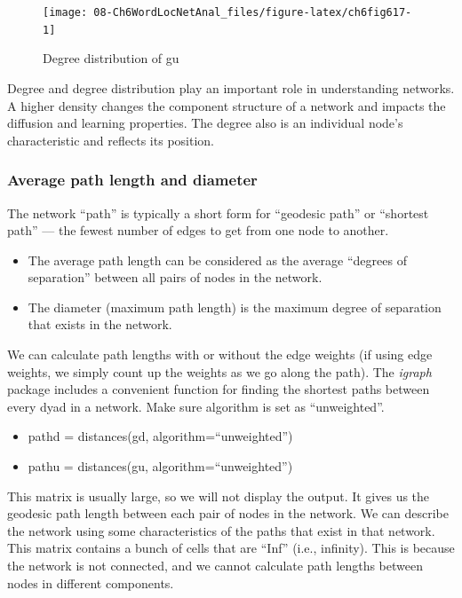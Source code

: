 \documentclass[
]{article}
\providecommand{\tightlist}{%
  \setlength{\itemsep}{0pt}\setlength{\parskip}{0pt}}
\begin{document}
\begin{figure}

{\centering \texttt{[image: 08-Ch6WordLocNetAnal\_files/figure-latex/ch6fig617-1]} 

}

\caption{Degree distribution of gu}\label{fig:ch6fig617}
\end{figure}

Degree and degree distribution play an important role in understanding networks. A higher density changes the component structure of a network and impacts the diffusion and learning properties. The degree also is an individual node's characteristic and reflects its position.

\hypertarget{average-path-length-and-diameter}{%
\subsubsection{Average path length and diameter}\label{average-path-length-and-diameter}}

The network ``path'' is typically a short form for ``geodesic path'' or ``shortest path'' --- the fewest number of edges to get from one node to another.

\begin{itemize}
\tightlist
\item
  The average path length can be considered as the average ``degrees of separation'' between all pairs of nodes in the network.
\item
  The diameter (maximum path length) is the maximum degree of separation that exists in the network.
\end{itemize}

We can calculate path lengths with or without the edge weights (if using edge weights, we simply count up the weights as we go along the path). The \emph{igraph} package includes a convenient function for finding the shortest paths between every dyad in a network. Make sure algorithm is set as ``unweighted''.

\begin{itemize}
\tightlist
\item
  pathd = distances(gd, algorithm=``unweighted'')
\item
  pathu = distances(gu, algorithm=``unweighted'')
\end{itemize}

This matrix is usually large, so we will not display the output. It gives us the geodesic path length between each pair of nodes in the network. We can describe the network using some characteristics of the paths that exist in that network. This matrix contains a bunch of cells that are ``Inf'' (i.e., infinity). This is because the network is not connected, and we cannot calculate path lengths between nodes in different components.
\end{document}
